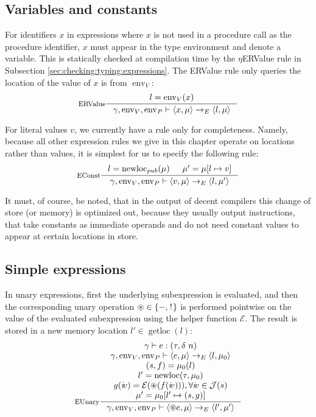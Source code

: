 \documentclass[a4paper, 10pt, draft]{report}
\DeclareMathOperator*{\env}{env}
\DeclareMathOperator*{\newloc}{newloc}
\newcommand{\mycode}[1]{\ensuremath{\mbox{\lstinline{#1}}}}
\newcommand{\anyop}{\ensuremath{\circledast}}
\begin{document}
\subsection{Variables and constants}\label{sec:semantics:expr:constvar}

For identifiers $x$ in expressions where $x$ is not used in a procedure call as
the procedure identifier, $x$ must appear in the type environment and denote a
variable. This is statically checked at compilation time by the $\eta$ERValue
rule in Subsection \ref{sec:checking:typing:expressions}. The ERValue rule only
queries the location of the value of $x$ is from $\operatorname{env}_V$:
\[ \inference[ERValue]{
  l = \env_V(x)
}{
  \gamma, \env_V, \env_P |- \left< x , \mu \right> \to_E \left<l, \mu \right>
} \]

For literal values $v$, we currently have a rule only for completeness. Namely,
because all other expression rules we give in this chapter operate on locations
rather than values, it is simplest for us to specify the following rule:
\[ \inference[EConst]{
  l = \newloc_{pub}(\mu) &
  \mu' = \mu[l \mapsto v]
}{
  \gamma, \env_V, \env_P |- \left<v, \mu\right> \to_E \left<l, \mu'\right>
} \]

It must, of course, be noted, that in the output of decent compilers this
change of store (or memory) is optimized out, because they usually output
instructions, that take constants as immediate operands and do not need
constant values to appear at certain locations in store.

\subsection{Simple expressions}\label{sec:semantics:expr:arith}

In unary expressions, first the underlying subexpression is evaluated, and then
the corresponding unary operation $\anyop \in \left\{\mycode{-},
\mycode{!}\right\}$ is performed pointwise on the value of the evaluated
subexpression using the helper function $\mathcal{E}$. The result is stored
in a new memory location $l'\in \operatorname{getloc}\!\left(l\right)$:
\[\inference[EUnary]{
  \gamma |- e : (\tau, \delta\ n) \\
  \gamma, \env_V, \env_P |- \left<e, \mu \right> \to_E \left<l, \mu_0 \right> \\
  (s, f) = \mu_0(l) \\
  l' = \newloc(\tau, \mu_0) \\
  g(i\!v) = \mathcal{E}(\anyop(f(i\!v))), \forall i\!v \in \mathcal{J}(s) \\
  \mu' = \mu_0[l' \mapsto (s, g)]
}{
  \gamma, \env_V, \env_P |- \left<\anyop e, \mu \right> \to_E \left<l', \mu'\right>
}\]
\end{document}
